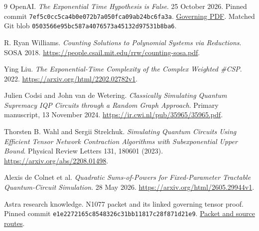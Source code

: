 \documentclass[11pt,a4paper]{article}
\theoremstyle{remark}\newtheorem{remark}[theorem]{Remark}
\begin{document}
\begin{thebibliography}{9}\small
{} OpenAI. \emph{The Exponential Time Hypothesis is False}.
25 October 2026. Pinned commit
\texttt{7ef5c0cc5ca4b0e072b7a050fca09ab24bc6fa3a}.
\href{https://github.com/openai/math/blob/7ef5c0cc5ca4b0e072b7a050fca09ab24bc6fa3a/preprints/The-Exponential-Time-Hypothesis-is-False-October-25-2026/paper.pdf}{Governing PDF}.
Matched Git blob \texttt{0503566e95bc587a4076573a45132d97531b8ba6}.

 R. Ryan Williams.
\emph{Counting Solutions to Polynomial Systems via Reductions}. SOSA 2018.
\url{https://people.csail.mit.edu/rrw/counting-sosa.pdf}.

 Ying Liu.
\emph{The Exponential-Time Complexity of the Complex Weighted \#CSP}. 2022.
\url{https://arxiv.org/html/2202.02782v1}.

 Julien Codsi and John van de Wetering.
\emph{Classically Simulating Quantum Supremacy IQP Circuits through a
Random Graph Approach}. Primary manuscript, 13 November 2024.
\url{https://ir.cwi.nl/pub/35965/35965.pdf}.

 Thorsten B. Wahl and Sergii Strelchuk.
\emph{Simulating Quantum Circuits Using Efficient Tensor Network
Contraction Algorithms with Subexponential Upper Bound}.
Physical Review Letters 131, 180601 (2023).
\url{https://arxiv.org/abs/2208.01498}.

 Alexis de Colnet et al.
\emph{Quadratic Sums-of-Powers for Fixed-Parameter Tractable
Quantum-Circuit Simulation}. 28 May 2026.
\url{https://arxiv.org/html/2605.29944v1}.

 Astra research knowledge. N1077 packet and its linked
governing tensor proof. Pinned commit
\texttt{e1e2272165c8548326c31bb11817c28f871d21e9}.
\href{https://github.com/harjassand/astra-research-knowledge/blob/e1e2272165c8548326c31bb11817c28f871d21e9/knowledge/current/packets/N1077.json}{Packet and source routes}.
\end{thebibliography}
\end{document}
